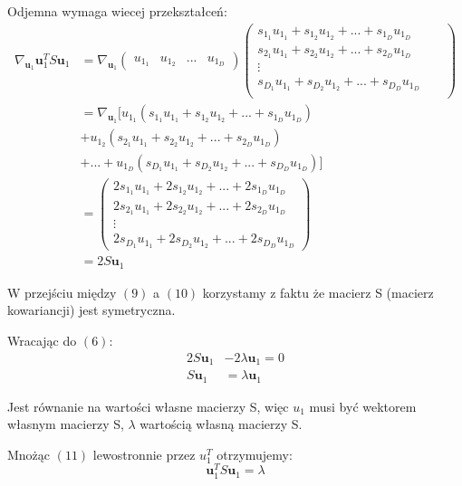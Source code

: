 \documentclass{article}
\newcommand{\bb}{\textbf}
\begin{document}
Odjemna wymaga wiecej przekształceń:
\begin{align}
	\nabla_{\bb{u}_1} \bb{u}_1^T S \bb{u}_1 
	&= \nabla_{\bb{u}_1} 
	\left( \begin{array}{llll} u_{1_1} & u_{1_2} & ... & u_{1_D} \end{array} \right)
	\begin{pmatrix}
         s_{1_1} u_{1_1} + s_{1_2} u_{1_2} + ... + s_{1_D} u_{1_D}  \\
		 s_{2_1} u_{1_1} + s_{2_2} u_{1_2} + ... + s_{2_D} u_{1_D} && \\
		 \vdots     \\
		 s_{D_1} u_{1_1} + s_{D_2} u_{1_2} + ... + s_{D_D} u_{1_D} && \\
    \end{pmatrix} \\
    &= \nabla_{\bb{u}_1} [u_{1_1} (s_{1_1} u_{1_1} + s_{1_2} u_{1_2} + ... + s_{1_D} u_{1_D})  \\
    				&+ u_{1_2} (s_{2_1} u_{1_1} + s_{2_2} u_{1_2} + ... + s_{2_D} u_{1_D}) \nonumber \\
    				&+ ... + u_{1_D} (s_{D_1} u_{1_1} + s_{D_2} u_{1_2} + ... + s_{D_D} u_{1_D})] \nonumber \\
    &= \begin{pmatrix}
    	2 s_{1_1} u_{1_1} + 2 s_{1_2} u_{1_2} + ... + 2 s_{1_D} u_{1_D}  \\
    	2 s_{2_1} u_{1_1} + 2 s_{2_2} u_{1_2} + ... + 2 s_{2_D} u_{1_D}  \\
    	\vdots     \\
	    2 s_{D_1} u_{1_1} + 2 s_{D_2} u_{1_2} + ... + 2 s_{D_D} u_{1_D}
    \end{pmatrix} \\
    &= 2 S \bb{u}_1
\end{align}

W przejściu między $(9)$ a $(10)$ korzystamy z faktu że macierz S (macierz kowariancji) jest symetryczna.

Wracając do $(6)$:
\begin{align}
	2 S \bb{u}_1 &- 2 \lambda \bb{u}_1 = 0	\nonumber \\
	S \bb{u}_1 &= \lambda \bb{u}_1 
\end{align}

Jest równanie na wartości własne macierzy S, więc $u_1$ musi być wektorem własnym macierzy S, $\lambda$ wartością własną macierzy S.

Mnożąc $(11)$ lewostronnie przez $u_1^T$ otrzymujemy:
\begin{equation}
	\bb{u}_1^T S \bb{u}_1 = \lambda
\end{equation}
\end{document}
